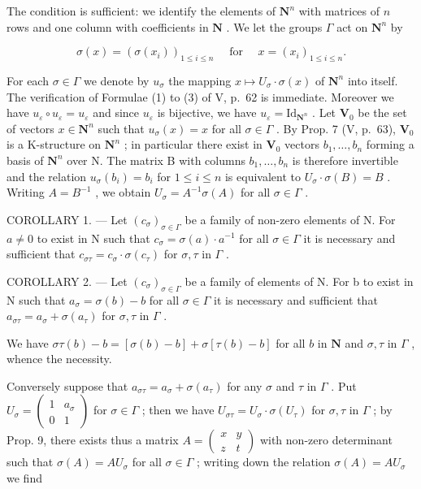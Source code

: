 The condition is sufficient: we identify the elements of \(\mathbf{N}^n\) with matrices of \(n\) rows and one column with coefficients in \(\mathbf{N}\) . We let the groups \(\Gamma\) act on \(\mathbf{N}^n\) by

\[
\sigma (x) = \left(\sigma \left(x _ {i}\right)\right) _ {1 \leqslant i \leqslant n} \quad \text { for } \quad x = \left(x _ {i}\right) _ {1 \leqslant i \leqslant n}.
\]

For each \(\sigma \in \Gamma\) we denote by \(u_{\sigma}\) the mapping \(x \mapsto U_{\sigma} \cdot \sigma(x)\) of \(\mathbf{N}^n\) into itself. The verification of Formulae (1) to (3) of V, p.~62 is immediate. Moreover we have \(u_{\varepsilon} \circ u_{\varepsilon} = u_{\varepsilon}\) and since \(u_{\varepsilon}\) is bijective, we have \(u_{\varepsilon} = \mathrm{Id}_{\mathbf{N}^n}\) . Let \(\mathbf{V}_0\) be the set of vectors \(x \in \mathbf{N}^n\) such that \(u_{\sigma}(x) = x\) for all \(\sigma \in \Gamma\) . By Prop. 7 (V, p.~63), \(\mathbf{V}_0\) is a K-structure on \(\mathbf{N}^n\) ; in particular there exist in \(\mathbf{V}_0\) vectors \(b_1, \ldots, b_n\) forming a basis of \(\mathbf{N}^n\) over N. The matrix B with columns \(b_1, \ldots, b_n\) is therefore invertible and the relation \(u_{\sigma}(b_i) = b_i\) for \(1 \leqslant i \leqslant n\) is equivalent to \(U_{\sigma} \cdot \sigma(B) = B\) . Writing \(A = B^{-1}\) , we obtain \(U_{\sigma} = A^{-1}\sigma(A)\) for all \(\sigma \in \Gamma\) .

COROLLARY 1. --- Let \((c_{\sigma})_{\sigma \in \Gamma}\) be a family of non-zero elements of N. For \(a \neq 0\) to exist in N such that \(c_{\sigma} = \sigma(a) \cdot a^{-1}\) for all \(\sigma \in \Gamma\) it is necessary and sufficient that \(c_{\sigma\tau} = c_{\sigma} \cdot \sigma(c_{\tau})\) for \(\sigma, \tau\) in \(\Gamma\) .

COROLLARY 2. --- Let \((c_{\sigma})_{\sigma \in \Gamma}\) be a family of elements of N. For b to exist in N such that \(a_{\sigma} = \sigma(b) - b\) for all \(\sigma \in \Gamma\) it is necessary and sufficient that \(a_{\sigma\tau} = a_{\sigma} + \sigma(a_{\tau})\) for \(\sigma, \tau\) in \(\Gamma\) .

We have \(\sigma \tau(b) - b = [\sigma(b) - b] + \sigma[\tau(b) - b]\) for all \(b\) in \(\mathbf{N}\) and \(\sigma, \tau\) in \(\Gamma\) , whence the necessity.

Conversely suppose that \(a_{\sigma \tau} = a_{\sigma} + \sigma(a_{\tau})\) for any \(\sigma\) and \(\tau\) in \(\Gamma\) . Put \(U_{\sigma} = \begin{pmatrix} 1 & a_{\sigma} \\ 0 & 1 \end{pmatrix}\) for \(\sigma \in \Gamma\) ; then we have \(U_{\sigma \tau} = U_{\sigma} \cdot \sigma(U_{\tau})\) for \(\sigma, \tau\) in \(\Gamma\) ; by Prop. 9, there exists thus a matrix \(A = \begin{pmatrix} x & y \\ z & t \end{pmatrix}\) with non-zero determinant such that \(\sigma(A) = AU_{\sigma}\) for all \(\sigma \in \Gamma\) ; writing down the relation \(\sigma(A) = AU_{\sigma}\) we find

